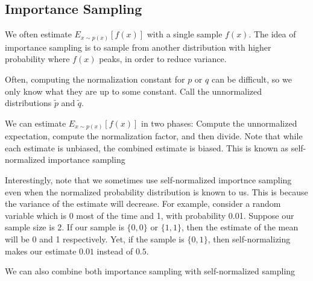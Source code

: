 \documentclass[12pt]{article}
\begin{document}
\subsection{Importance Sampling}

We often estimate $E_{x \sim p(x)}[f(x)]$
with a single sample $f(x)$. The idea of importance sampling is to sample from another distribution with higher probability where $f(x)$ peaks, in order to reduce variance.


Often, computing the normalization constant for $p$ or $q$ can be difficult, so we only know what they are up to some constant. Call the unnormalized distributions $\tilde p$ and $\tilde q$. 

We can estimate $E_{x \sim p(x)}[f(x)]$ in two phases: Compute the unnormalized expectation, compute the normalization factor, and then divide. Note that while each estimate is unbiased, the combined estimate is biased. This is known as self-normalized importance sampling


Interestingly, note that we sometimes use self-normalized importnce sampling even when the normalized probability distribution is known to us. This is because the variance of the estimate will decrease. For example, consider a random variable which is 0 most of the time and 1, with probability 0.01. Suppose our sample size is 2. If our sample is $\{0,0\}$ or $\{1,1\}$, then the estimate of the mean will be 0 and 1 respectively. Yet, if the sample is $\{0,1\}$, then self-normalizing makes our estimate $0.01$ instead of $0.5$.

We can also combine both importance sampling with self-normalized sampling

\iffalse
{}

\end{document}
